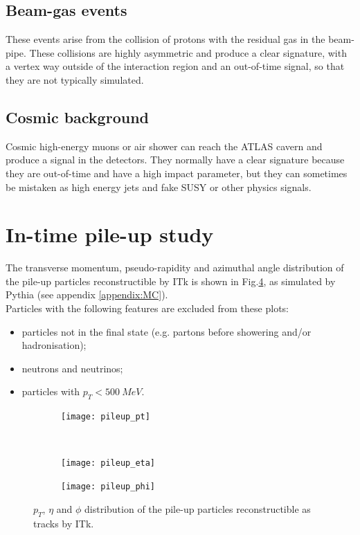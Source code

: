 \documentclass[a4paper,twoside,12pt]{book}
\begin{document}
\subsection*{Beam-gas events}
These events arise from the collision of protons with the residual gas in the beam-pipe. These
collisions are highly asymmetric and produce a clear signature, with a vertex way outside of
the interaction region and an out-of-time signal, so that they are not typically simulated\cite{ATLAS_pileup}.

\subsection*{Cosmic background}
Cosmic high-energy muons or air shower can reach the ATLAS cavern and produce a signal in the detectors.
They normally have a clear signature because they are out-of-time and have a high impact
parameter, but they can sometimes
be mistaken as high energy jets and fake SUSY or other physics signals\cite{ATLAS_cosmic}. \\

\section{In-time pile-up study}

The transverse momentum, pseudo-rapidity and azimuthal angle distribution of the pile-up particles reconstructible by ITk is shown in Fig.\ref{fig:pileupDists}, as simulated by 
Pythia (see appendix \ref{appendix:MC}).\\

Particles with the following
features are excluded from these plots:

\begin{itemize}
\item particles not in the final state (e.g. partons before showering and/or hadronisation);
\item neutrons and neutrinos;
\item particles with $p_{T} < 500\ MeV$.
\end{itemize}

\begin{figure}
\begin{subfigure}{\linewidth}
\texttt{[image: pileup\_pt]}
\caption{}
\label{fig:pileup_pt}
\end{subfigure}\\[1ex]
\begin{subfigure}{.5\linewidth}
\centering
\texttt{[image: pileup\_eta]}
\caption{}
\label{fig:pileup_eta}
\end{subfigure}
\begin{subfigure}{.5\linewidth}
\centering
\texttt{[image: pileup\_phi]}
\caption{}
\label{fig:pileup_phi}
\end{subfigure}
\caption{$p_{T}$, $\eta$ and $\phi$ distribution of the pile-up particles reconstructible as tracks by ITk.}
\label{fig:pileupDists}
\end{figure}
\end{document}

